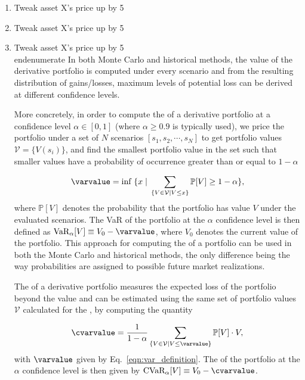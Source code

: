 \begin{enumerate}
	\item Tweak asset X's price up by 5\	\item Tweak asset X's price up by 5\	\item Tweak asset X's price up by 5\\end{enumerate}
In both Monte Carlo and historical \var{} methods, the value of the derivative portfolio is computed under every scenario and from the resulting distribution of gains/losses, maximum levels of potential loss can be derived at different confidence levels.

More concretely, in order to compute the \var{} of a derivative portfolio at a confidence level $\alpha \in [0,1]$ (where $\alpha \ge 0.9$ is typically used), we price the portfolio under a set of $N$ scenarios $[s_1, s_2, \cdots, s_N]$ to get portfolio values $\mathcal{V} = \{V(s_i)\}$, and find the smallest portfolio value in the set such that smaller values have a probability of occurrence greater than or equal to $1-\alpha$

\begin{equation}
	\label{eqn:var_definition}
	\varvalue = \textrm{inf } \{x \; | \; \sum_{\{V \in \mathcal{V} | V \le x\}}\mathbb{P}[V] \ge 1-\alpha\},
\end{equation}
where $\mathbb{P}[V]$ denotes the probability that the portfolio has value $V$ under the evaluated scenarios.
The VaR of the portfolio at the $\alpha$ confidence level is then defined as $\textrm{VaR}_{\alpha}[V] \equiv V_0 - \varvalue$, where $V_0$ denotes the current value of the portfolio.
This approach for computing the \var{} of a portfolio can be used in both the Monte Carlo and historical methods, the only difference being the way probabilities are assigned to possible future market realizations.

The \cvar{} of a derivative portfolio measures the expected loss of the portfolio beyond the \var{} value and can be estimated using the same set of portfolio values $\mathcal{V}$ calculated for the \var{}, by computing the quantity

\begin{equation}
	\label{eqn:cvar_definition}
	\cvarvalue = \frac{1}{1-\alpha}\sum_{\{V \in \mathcal{V} | V \le \varvalue\}}\mathbb{P}[V]\cdot V,
\end{equation}
with $\varvalue$ given by Eq.~\eqref{eqn:var_definition}.
The \cvar{} of the portfolio at the $\alpha$ confidence level is then given by $\textrm{CVaR}_{\alpha}[V] \equiv V_0 - \cvarvalue$.


\end{enumerate}
